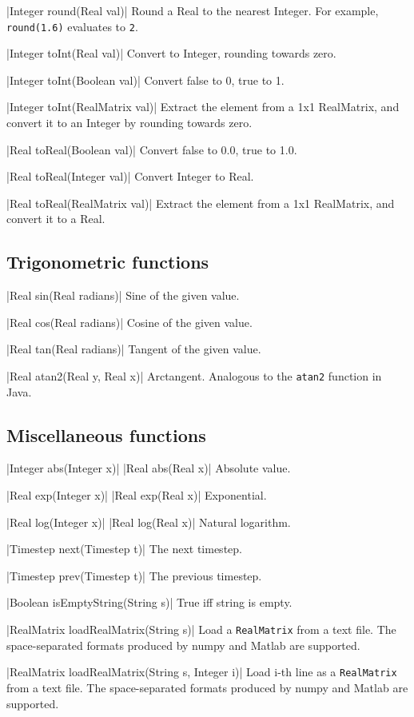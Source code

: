 \blog|Integer round(Real val)|
\myindent Round a Real to the nearest Integer.
For example, \verb|round(1.6)| evaluates to \verb|2|.

\blog|Integer toInt(Real val)|
\myindent Convert to Integer, rounding towards zero.

\blog|Integer toInt(Boolean val)|
\myindent Convert false to 0, true to 1.

\blog|Integer toInt(RealMatrix val)|
\myindent Extract the element from a 1x1 RealMatrix, and convert it to an
Integer by rounding towards zero.

\blog|Real toReal(Boolean val)|
\myindent Convert false to 0.0, true to 1.0.

\blog|Real toReal(Integer val)|
\myindent Convert Integer to Real.

\blog|Real toReal(RealMatrix val)|
\myindent Extract the element from a 1x1 RealMatrix, and convert it to a Real.


\subsection{Trigonometric functions}
\label{sec:builtin-trig}

\blog|Real sin(Real radians)|
\myindent Sine of the given value.

\blog|Real cos(Real radians)|
\myindent Cosine of the given value.

\blog|Real tan(Real radians)|
\myindent Tangent of the given value.

\blog|Real atan2(Real y, Real x)|
\myindent Arctangent. Analogous to the \verb|atan2| function in Java.


\subsection{Miscellaneous functions}
\label{sec:builtin-misc}

\blog|Integer abs(Integer x)|
\blog|Real abs(Real x)|
\myindent Absolute value.

\blog|Real exp(Integer x)|
\blog|Real exp(Real x)|
\myindent Exponential.

\blog|Real log(Integer x)|
\blog|Real log(Real x)|
\myindent Natural logarithm.

\blog|Timestep next(Timestep t)|
\myindent The next timestep.

\blog|Timestep prev(Timestep t)|
\myindent The previous timestep.

\blog|Boolean isEmptyString(String s)|
\myindent True iff string is empty.

\blog|RealMatrix loadRealMatrix(String s)|
\myindent Load a \verb|RealMatrix| from a text file. The space-separated
formats produced by numpy and Matlab are supported.

\blog|RealMatrix loadRealMatrix(String s, Integer i)|
\myindent Load i-th line as a \verb|RealMatrix| from a text file. 
The space-separated formats produced by numpy and Matlab are supported.